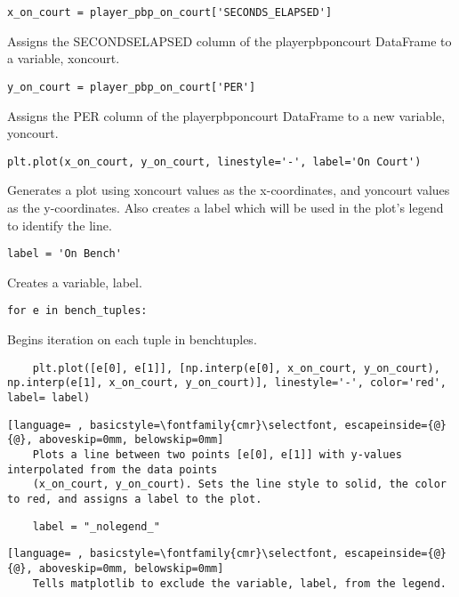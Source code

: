 \documentclass{article}
\begin{document}
\begin{lstlisting}
x_on_court = player_pbp_on_court['SECONDS_ELAPSED']
\end{lstlisting}
Assigns the SECONDS\textunderscore ELAPSED column of the player\textunderscore pbp\textunderscore on\textunderscore court DataFrame to a variable, x\textunderscore on\textunderscore court.
\begin{lstlisting}
y_on_court = player_pbp_on_court['PER']
\end{lstlisting}
Assigns the PER column of the player\textunderscore pbp\textunderscore on\textunderscore court DataFrame to a new variable, y\textunderscore on\textunderscore court.
\begin{lstlisting}
plt.plot(x_on_court, y_on_court, linestyle='-', label='On Court')
\end{lstlisting}
Generates a plot using x\textunderscore on\textunderscore court values as the x-coordinates, and y\textunderscore on\textunderscore court values as the y-coordinates. Also creates a label which will be used in the plot's legend to identify the line.
\begin{lstlisting}
label = 'On Bench'
\end{lstlisting}
Creates a variable, label.
\begin{lstlisting}
for e in bench_tuples:
\end{lstlisting}
Begins iteration on each tuple in bench\textunderscore tuples.
\begin{lstlisting}
    plt.plot([e[0], e[1]], [np.interp(e[0], x_on_court, y_on_court), np.interp(e[1], x_on_court, y_on_court)], linestyle='-', color='red', label= label)
\end{lstlisting}
\begin{lstlisting}[language= , basicstyle=\fontfamily{cmr}\selectfont, escapeinside={@}{@}, aboveskip=0mm, belowskip=0mm]
    Plots a line between two points [e[0], e[1]] with y-values interpolated from the data points
    (x_on_court, y_on_court). Sets the line style to solid, the color to red, and assigns a label to the plot.
\end{lstlisting}
\begin{lstlisting}
    label = "_nolegend_"
\end{lstlisting}
\begin{lstlisting}[language= , basicstyle=\fontfamily{cmr}\selectfont, escapeinside={@}{@}, aboveskip=0mm, belowskip=0mm]
    Tells matplotlib to exclude the variable, label, from the legend.
\end{lstlisting}
\end{document}
